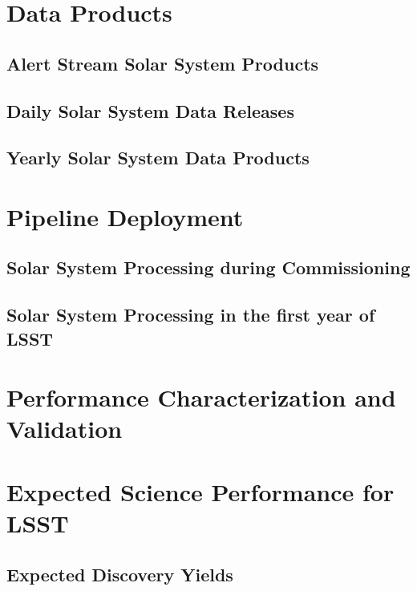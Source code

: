 \section{Data Products}

\subsection{Alert Stream Solar System Products}
\subsection{Daily Solar System Data Releases}
\subsection{Yearly Solar System Data Products}

\section{Pipeline Deployment}
\subsection{Solar System Processing during Commissioning}
\subsection{Solar System Processing in the first year of LSST}

\section{Performance Characterization and Validation}

\section{Expected Science Performance for LSST}
\subsection{Expected Discovery Yields}
